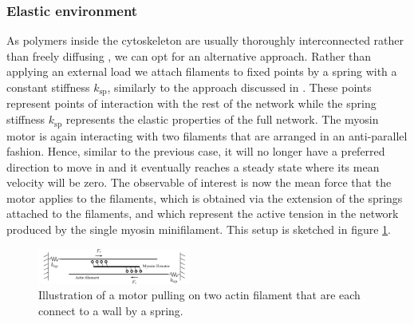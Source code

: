 \documentclass[aps,pre,twocolumn,showpacs,showkeys,superscriptaddress,floatfix]{revtex4-1}
\begin{document}
\subsubsection{Elastic environment}
\label{sec:environment}
As polymers inside the cytoskeleton are usually thoroughly interconnected rather than freely diffusing \cite{blanchoin2014actin,ennomani2016architecture},
we can opt for an alternative approach.
Rather than applying an external load we attach filaments to fixed points by a spring with a constant stiffness $k_\text{sp}$, 
similarly to the approach discussed in \cite{Albert2014}. 
These points represent points of interaction with the rest of the network while the spring stiffness $k_\text{sp}$ represents the elastic properties of the full network. 
The myosin motor is again interacting with two filaments that are arranged in an anti-parallel fashion. 
Hence, similar to the previous case, it will no longer have a preferred direction to move in and 
it eventually reaches a steady state where its mean velocity will be zero. 
The observable of interest is now the mean force that the motor applies to the filaments, 
which is obtained via the extension of the springs attached to the filaments,
and which represent the active tension in the network produced by the single myosin minifilament. 
This setup is sketched in figure \ref{fig:tug}. 
\begin{figure}[t]
\centering
\includegraphics[width=0.45\textwidth,height=!]{tug}
\caption{
\label{fig:tug}
Illustration of a motor pulling on two actin filament that are each connect to a wall by a spring.
}
\end{figure}
\end{document}
